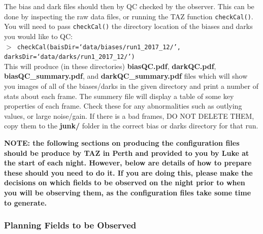 \documentclass[12pt]{article}
\begin{document}
The bias and dark files should then by QC checked by the observer. This can be done by inspecting the raw data files, or running the TAZ function \texttt{checkCal()}. You will need to pass \texttt{checkCal()} the directory location of the biases and darks you would like to QC:\\

 \texttt{$>$ checkCal(baisDir=`data/biases/run1\_2017\_12/', \\ darksDir=`data/darks/run1\_2017\_12/')} \\
 
This will produce (in these directories) \textbf{biasQC.pdf}, \textbf{darkQC.pdf}, \textbf{biasQC\_summary.pdf}, and \textbf{darkQC\_summary.pdf} files  which will show you images of all of the biases/darks in the given directory and print a number of stats about each frame. The summery file will display a table of some key properties of each frame. Check these for any abnormalities such as outlying values, or large noise/gain. If there is a bad frames, DO NOT DELETE THEM,  copy them to the \textbf{junk/} folder in the correct bias or darks directory for that run. 


\textbf{\textcolor{PineGreen}{NOTE: the following sections on producing the configuration files should be produce by TAZ in Perth and provided to you by Luke at the start of each night. However, below are details of how to prepare these should you need to do it. If you are doing this, please make the decisions on which fields to be observed on the night prior to when you will be observing them, as the configuration files take some time to generate. }}


\subsubsection{Planning Fields to be Observed}
\end{document}
